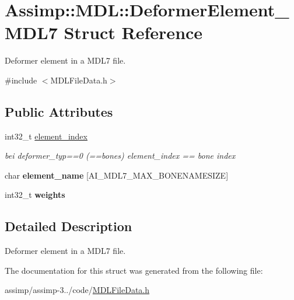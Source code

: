 \hypertarget{struct_assimp_1_1_m_d_l_1_1_deformer_element___m_d_l7}{\section{Assimp\+:\+:M\+D\+L\+:\+:Deformer\+Element\+\_\+\+M\+D\+L7 Struct Reference}
\label{struct_assimp_1_1_m_d_l_1_1_deformer_element___m_d_l7}
}


Deformer element in a M\+D\+L7 file.  




{\ttfamily \#include $<$M\+D\+L\+File\+Data.\+h$>$}

\subsection*{Public Attributes}
\begin{DoxyCompactItemize}
\item 
\hypertarget{struct_assimp_1_1_m_d_l_1_1_deformer_element___m_d_l7_a5019a6725a81d02247b1689852dfd235}{int32\+\_\+t \hyperlink{struct_assimp_1_1_m_d_l_1_1_deformer_element___m_d_l7_a5019a6725a81d02247b1689852dfd235}{element\+\_\+index}}\label{struct_assimp_1_1_m_d_l_1_1_deformer_element___m_d_l7_a5019a6725a81d02247b1689852dfd235}

\begin{DoxyCompactList}\small\item\em bei deformer\+\_\+typ==0 (==bones) element\+\_\+index == bone index \end{DoxyCompactList}\item 
\hypertarget{struct_assimp_1_1_m_d_l_1_1_deformer_element___m_d_l7_a492ab7b7087283122bfbdfa0e907820c}{char {\bfseries element\+\_\+name} \mbox{[}A\+I\+\_\+\+M\+D\+L7\+\_\+\+M\+A\+X\+\_\+\+B\+O\+N\+E\+N\+A\+M\+E\+S\+I\+Z\+E\mbox{]}}\label{struct_assimp_1_1_m_d_l_1_1_deformer_element___m_d_l7_a492ab7b7087283122bfbdfa0e907820c}

\item 
\hypertarget{struct_assimp_1_1_m_d_l_1_1_deformer_element___m_d_l7_a7212b3136fdc6e8ad665be0774ca0100}{int32\+\_\+t {\bfseries weights}}\label{struct_assimp_1_1_m_d_l_1_1_deformer_element___m_d_l7_a7212b3136fdc6e8ad665be0774ca0100}

\end{DoxyCompactItemize}


\subsection{Detailed Description}
Deformer element in a M\+D\+L7 file. 

The documentation for this struct was generated from the following file\+:\begin{DoxyCompactItemize}
\item 
assimp/assimp-\/3../code/\hyperlink{_m_d_l_file_data_8h}{M\+D\+L\+File\+Data.\+h}\end{DoxyCompactItemize}
